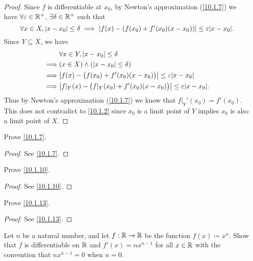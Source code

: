 \begin{proof}
  Since \(f\) is differentiable at \(x_0\), by Newton's approximation (\cref{10.1.7}) we have \(\forall \varepsilon \in \mathbb{R}^+\), \(\exists \delta \in \mathbb{R}^+\) such that
  \[
    \forall x \in X, \abs{x - x_0} \leq \delta \implies \abs{f(x) - (f(x_0) + f'(x_0)(x - x_0))} \leq \varepsilon \abs{x - x_0}.
  \]
  Since \(Y \subseteq X\), we have
  \begin{align*}
             & \forall x \in Y, \abs{x - x_0} \leq \delta                                             \\
    \implies & (x \in X) \land (\abs{x - x_0} \leq \delta)                                            \\
    \implies & \abs{f(x) - \big(f(x_0) + f'(x_0)(x - x_0)\big)} \leq \varepsilon \abs{x - x_0}        \\
    \implies & \abs{f|_Y(x) - \big(f|_Y(x_0) + f'(x_0)(x - x_0)\big)} \leq \varepsilon \abs{x - x_0}.
  \end{align*}
  Thus by Newton's approximation (\cref{10.1.7}) we know that \(f|_Y'(x_0) = f'(x_0)\).
  This does not contradict to \cref{10.1.2} since \(x_0\) is a limit point of \(Y\) implies \(x_0\) is also a limit point of \(X\).
\end{proof}

\begin{ex}\label{ex:10.1.2}
  Prove \cref{10.1.7}.
\end{ex}

\begin{proof}
  See \cref{10.1.7}.
\end{proof}

\begin{ex}\label{ex:10.1.3}
  Prove \cref{10.1.10}.
\end{ex}

\begin{proof}
  See \cref{10.1.10}.
\end{proof}

\begin{ex}\label{ex:10.1.4}
  Prove \cref{10.1.13}.
\end{ex}

\begin{proof}
  See \cref{10.1.13}.
\end{proof}

\begin{ex}\label{ex:10.1.5}
  Let \(n\) be a natural number, and let \(f : \mathbb{R} \to \mathbb{R}\) be the function \(f(x) \coloneqq x^n\).
  Show that \(f\) is differentiable on \(\mathbb{R}\) and \(f'(x) = n x^{n - 1}\) for all \(x \in \mathbb{R}\) with the convention that \(n x^{n - 1} = 0\) when \(n = 0\).
\end{ex}

